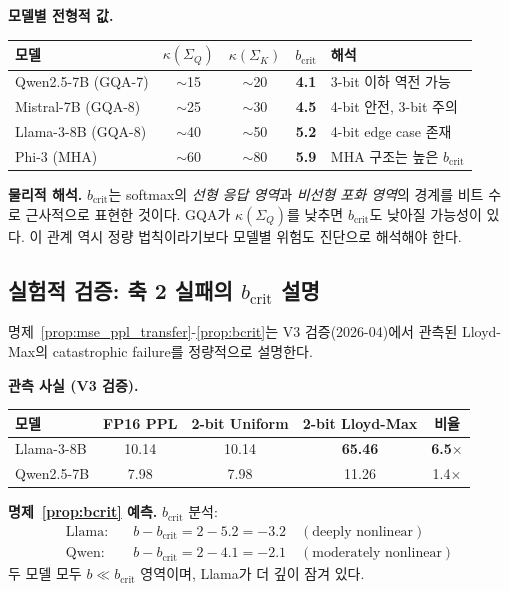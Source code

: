 \begin{theorycomment}
\textbf{모델별 전형적 값.}
\begin{center}
\begin{tabular}{lcccl}
\toprule
모델 & $\kappa(\Sigma_Q)$ & $\kappa(\Sigma_K)$ & $b_{\mathrm{crit}}$ & 해석 \\
\midrule
Qwen2.5-7B (GQA-7) & $\sim$15 & $\sim$20 & \textbf{4.1} & 3-bit 이하 역전 가능 \\
Mistral-7B (GQA-8) & $\sim$25 & $\sim$30 & \textbf{4.5} & 4-bit 안전, 3-bit 주의 \\
Llama-3-8B (GQA-8) & $\sim$40 & $\sim$50 & \textbf{5.2} & 4-bit edge case 존재 \\
Phi-3 (MHA)        & $\sim$60 & $\sim$80 & \textbf{5.9} & MHA 구조는 높은 $b_{\mathrm{crit}}$ \\
\bottomrule
\end{tabular}
\end{center}
\textbf{물리적 해석.} $b_{\mathrm{crit}}$는 softmax의 \emph{선형 응답 영역}과 \emph{비선형 포화 영역}의 경계를 비트 수로 근사적으로 표현한 것이다. GQA가 $\kappa(\Sigma_Q)$를 낮추면 $b_{\mathrm{crit}}$도 낮아질 가능성이 있다. 이 관계 역시 정량 법칙이라기보다 모델별 위험도 진단으로 해석해야 한다.
\end{theorycomment}

\subsection{실험적 검증: 축 2 실패의 $b_{\mathrm{crit}}$ 설명}
\label{sec:axis2_verification}

명제~\ref{prop:mse_ppl_transfer}-\ref{prop:bcrit}는 V3 검증(2026-04)에서 관측된 Lloyd-Max의 catastrophic failure를 정량적으로 설명한다.

\textbf{관측 사실 (V3 검증).}
\begin{center}
\begin{tabular}{lcccc}
\toprule
모델 & FP16 PPL & 2-bit Uniform & 2-bit Lloyd-Max & 비율 \\
\midrule
Llama-3-8B  & 10.14 & 10.14 & \textbf{65.46} & \textbf{6.5}$\times$ \\
Qwen2.5-7B  & 7.98  & 7.98  & 11.26          & 1.4$\times$ \\
\bottomrule
\end{tabular}
\end{center}

\textbf{명제~\ref{prop:bcrit} 예측.} $b_{\mathrm{crit}}$ 분석:
\begin{align*}
\text{Llama:}\quad & b - b_{\mathrm{crit}} = 2 - 5.2 = -3.2 \quad (\text{deeply nonlinear}) \\
\text{Qwen:}\quad  & b - b_{\mathrm{crit}} = 2 - 4.1 = -2.1 \quad (\text{moderately nonlinear})
\end{align*}
두 모델 모두 $b \ll b_{\mathrm{crit}}$ 영역이며, Llama가 더 깊이 잠겨 있다.

